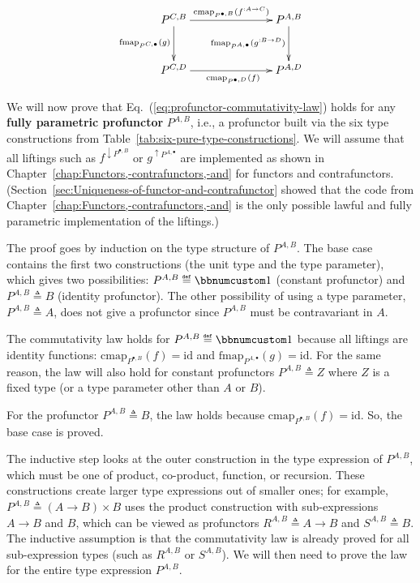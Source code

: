 \begin{wrapfigure}{i}{0.37\columnwidth}%
\vspace{-1.7\baselineskip}
\[
\xymatrix{\xyScaleY{2.5pc}\xyScaleX{6.0pc}P^{C,B}\ar[r]\sp(0.55){\text{cmap}_{P^{\bullet,B}}(f^{:A\rightarrow C})~~~}\ar[d]\sb(0.45){\text{fmap}_{P^{C,\bullet}}(g)} & P^{A,B}\ar[d]\sb(0.45){\text{fmap}_{P^{A,\bullet}}(g^{:B\rightarrow D})}\\
P^{C,D}\ar[r]\sb(0.45){~~~~\text{cmap}_{P^{\bullet,D}}(f)} & P^{A,D}
}
\]

\vspace{-1.7\baselineskip}
\end{wrapfigure}%

\noindent We will now prove that Eq.~(\ref{eq:profunctor-commutativity-law})
holds for any \textbf{fully parametric profunctor}
$P^{A,B}$, i.e., a profunctor built via the six type constructions
from Table~\ref{tab:six-pure-type-constructions}. We will assume
that all liftings such as $f^{\downarrow P^{\bullet,B}}$ or $g^{\uparrow P^{A,\bullet}}$
are implemented as shown in Chapter~\ref{chap:Functors,-contrafunctors,-and}
for functors and contrafunctors. (Section~\ref{sec:Uniqueness-of-functor-and-contrafunctor}
showed that the code from Chapter~\ref{chap:Functors,-contrafunctors,-and}
is the only possible lawful and fully parametric implementation of
the liftings.)

The proof goes by induction on the type structure of $P^{A,B}$. The
base case contains the first two constructions (the unit type and
the type parameter), which gives two possibilities: $P^{A,B}\triangleq\bbnum 1$
(constant profunctor) and $P^{A,B}\triangleq B$ (identity profunctor).
The other possibility of using a type parameter, $P^{A,B}\triangleq A$,
does not give a profunctor since $P^{A,B}$ must be contravariant
in $A$.

The commutativity law holds for $P^{A,B}\triangleq\bbnum 1$ because
all liftings are identity functions: $\text{cmap}_{P^{\bullet,B}}(f)=\text{id}$
and $\text{fmap}_{P^{A,\bullet}}(g)=\text{id}$. For the same reason,
the law will also hold for constant profunctors $P^{A,B}\triangleq Z$
where $Z$ is a fixed type (or a type parameter other than $A$ or
$B$).

For the profunctor $P^{A,B}\triangleq B$, the law holds because $\text{cmap}_{P^{\bullet,B}}(f)=\text{id}$.
So, the base case is proved.

The inductive step looks at the outer construction in the type expression
of $P^{A,B}$, which must be one of product, co-product, function,
or recursion. These constructions create larger type expressions out
of smaller ones; for example, $P^{A,B}\triangleq\left(A\rightarrow B\right)\times B$
uses the product construction with sub-expressions $A\rightarrow B$
and $B$, which can be viewed as profunctors $R^{A,B}\triangleq A\rightarrow B$
and $S^{A,B}\triangleq B$. The inductive assumption is that the commutativity
law is already proved for all sub-expression types (such as $R^{A,B}$
or $S^{A,B}$). We will then need to prove the law for the entire
type expression $P^{A,B}$.

